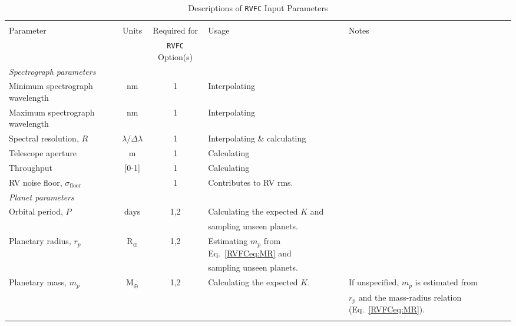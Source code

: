 \clearpage
\begin{landscape}
\begin{table*}
  \small
  \renewcommand{\arraystretch}{0.7}
  \caption{Descriptions of \texttt{RVFC} Input Parameters}
  \label{RVFCtable:rvfc}
  \begin{tabular}{lccll}
    \hline \\ [-1ex]
    Parameter & Units & Required for & Usage & Notes \\
    & & \texttt{RVFC} Option(s) & & \\
    \hline
    \emph{Spectrograph parameters} & & & \\
    Minimum spectrograph wavelength & nm & 1 & Interpolating \sigRV{.} & \\
    Maximum spectrograph wavelength & nm & 1 & Interpolating \sigRV{.} & \\
    Spectral resolution, $R$ & $\lambda / \Delta \lambda$ & 1 & Interpolating \& calculating \sigRV{.} & \\
    Telescope aperture & m & 1 & Calculating \sigRV{.} & \\
    Throughput & [0-1] & 1 & Calculating \sigRV{.} & \\
    RV noise floor, $\sigma_{\text{floor}}$ & \mps{} & 1 & Contributes to RV rms. & \\
    \hline \smallskip

    \emph{Planet parameters} & & & \\
    Orbital period, $P$ & days & 1,2 & Calculating the expected $K$ and & \\ & & & sampling unseen planets. & \\
    Planetary radius, $r_p$ & R$_{\oplus}$ & 1,2 & Estimating $m_p$ from Eq.~\ref{RVFCeq:MR} and & \\ &&& sampling unseen planets. & \\ 
    Planetary mass, $m_p$ & M$_{\oplus}$ & 1,2 & Calculating the expected $K$. & If unspecified, $m_p$ is estimated from \\ &&&& $r_p$ and the mass-radius relation (Eq.~\ref{RVFCeq:MR}). \\
    \hline \smallskip


\end{tabular}
\end{table*}
\end{landscape}
